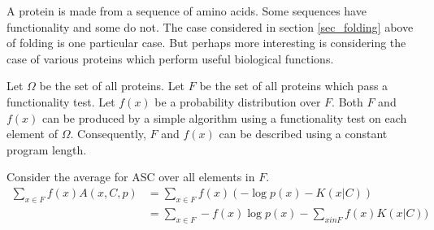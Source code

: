 A protein is made from a sequence of amino acids.
Some sequences have functionality and some do not.
The case considered in section \ref{sec_folding} above of folding is one particular case.
But perhaps more interesting is considering the case of various proteins which perform useful biological functions.

Let $\Omega$ be the set of all proteins.
Let $F$ be the set of all proteins which pass a functionality test.
Let $f(x)$ be a probability distribution over $F$.
Both $F$ and $f(x)$ can be produced by a simple algorithm using a functionality test on each element of $\Omega$.
Consequently, $F$ and $f(x)$ can be described using a constant program length.

Consider the average for ASC over all elements in $F$.
\begin{align}
    \label{ASC.FSC.1}
    \sum_{x \in F} f(x) A(x,C,p) 
    &= \sum_{x \in F} f(x) (-\log p(x) - K(x|C))  \nonumber \\
    &= \sum_{x \in F} -f(x)\log p(x) - \sum_{x in F} f(x) K(x|C))
\end{align}

